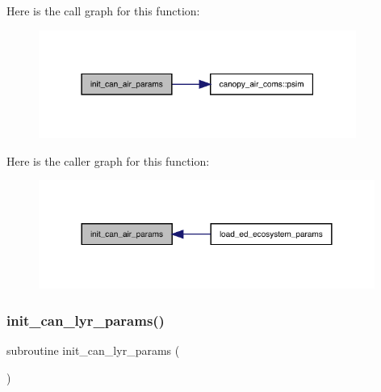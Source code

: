 Here is the call graph for this function\+:
\nopagebreak
\begin{figure}[H]
\begin{center}
\leavevmode
\includegraphics[width=295pt]{ed__params_8f90_a029548f8d070ed57f9c9b1e1a0a8fc3c_cgraph}
\end{center}
\end{figure}
Here is the caller graph for this function\+:
\nopagebreak
\begin{figure}[H]
\begin{center}
\leavevmode
\includegraphics[width=312pt]{ed__params_8f90_a029548f8d070ed57f9c9b1e1a0a8fc3c_icgraph}
\end{center}
\end{figure}
\mbox{\label{ed__params_8f90_a8006ef395d1da1e27d9cd7a2092b7505}} 
\subsubsection{\texorpdfstring{init\+\_\+can\+\_\+lyr\+\_\+params()}{init\_can\_lyr\_params()}}
{\footnotesize\ttfamily subroutine init\+\_\+can\+\_\+lyr\+\_\+params (\begin{DoxyParamCaption}{ }\end{DoxyParamCaption})}

